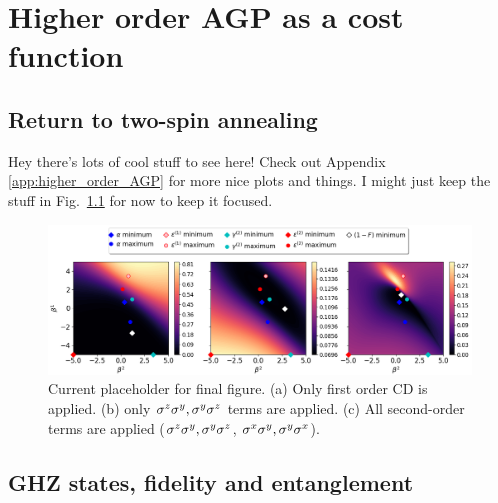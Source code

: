 \chapter{Higher order AGP as a cost function}\label{chap:7_higher_order_agp}

\section{Return to two-spin annealing}

Hey there's lots of cool stuff to see here! Check out Appendix \ref{app:higher_order_AGP} for more nice plots and things. I might just keep the stuff in Fig.~\ref{fig:two_spin_higher_order} for now to keep it focused.

\begin{figure}[h]
    \centering
    \includegraphics[width=\linewidth]{images/2spin_Integrals_scaled_by_norm_final.png} \caption[Two-spin annealing fidelity contour plots]{Current placeholder for final figure. (a) Only first order CD is applied. (b) only $\sigma^z\sigma^y, \sigma^y\sigma^z$ terms are applied. (c) All second-order terms are applied ($\sigma^z\sigma^y, \sigma^y\sigma^z$, $\sigma^x\sigma^y, \sigma^y\sigma^x$).}\label{fig:two_spin_higher_order}
\end{figure}

\section{GHZ states, fidelity and entanglement}

